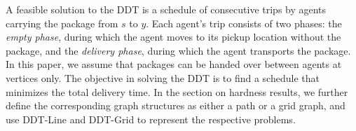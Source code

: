 A feasible solution to the DDT is a schedule of consecutive trips by agents carrying the package from $s$ to $y$. Each agent's trip consists of two phases: the \emph{empty phase}, during which the agent moves to its pickup location without the package, and the \emph{delivery phase}, during which the agent transports the package.  
In this paper, we assume that packages can be handed over between agents at vertices only. %
The objective in solving the DDT is to find a schedule that minimizes the total delivery time. In the section on hardness results, we further define the corresponding graph structures as either a path or a grid graph, and use DDT-Line and DDT-Grid to represent the respective problems. 

